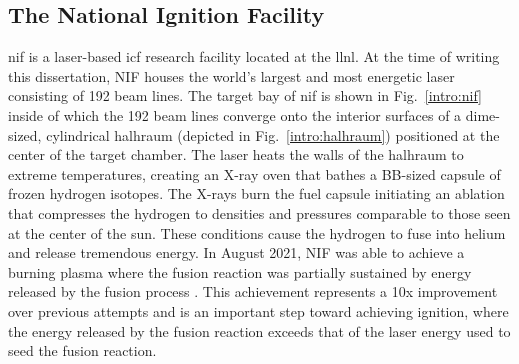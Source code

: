 \documentclass[../doc.tex]{subfiles}
\begin{document}
\subsection{The National Ignition Facility}
\gls{nif} is a laser-based \gls{icf} research facility located at the \gls{llnl}. At the time of writing this dissertation, NIF houses the world's largest and most energetic laser consisting of 192 beam lines. The target bay of \gls{nif} is shown in Fig.~\ref{intro:nif} inside of which the 192 beam lines converge onto the interior surfaces of a dime-sized, cylindrical halhraum (depicted in Fig.~\ref{intro:halhraum}) positioned at the center of the target chamber. The laser heats the walls of the halhraum to extreme temperatures, creating an X-ray oven that bathes a BB-sized capsule of frozen hydrogen isotopes. The X-rays burn the fuel capsule initiating an ablation that compresses the hydrogen to densities and pressures comparable to those seen at the center of the sun. These conditions cause the hydrogen to fuse into helium and release tremendous energy. In August 2021, NIF was able to achieve a burning plasma where the fusion reaction was partially sustained by energy released by the fusion process \cite{Zylstra2022}. This achievement represents a 10x improvement over previous attempts and is an important step toward achieving ignition, where the energy released by the fusion reaction exceeds that of the laser energy used to seed the fusion reaction. 
\end{document}
